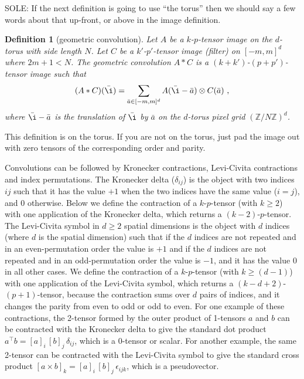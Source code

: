 \documentclass{article}
\theoremstyle{plain}
\newtheorem{definition}{Definition}
\begin{document}
SOLE: If the next definition is going to use ``the torus'' then we should say a few words about that up-front, or above in the image definition.

\begin{definition}[geometric convolution]
Let $A$ be a $k$-$p$-tensor image on the $d$-torus with side length $N$.
Let $C$ be a $k'$-$p'$-tensor image (filter) on $[-m, m]^d$ where $2m+1<N$.
The geometric convolution $A\ast C$ is a $(k+k')$-$(p+p')$-tensor image such that
\begin{equation}
    (A\ast C)(\bar\i) = \sum_{\bar a\in[-m, m]^d} A(\bar\i - \bar a)\otimes C(\bar a) ~,
\end{equation}
where $\bar\i - \bar a$ is the translation of $\bar\i$ by $\bar a$ on the $d$-torus pixel grid $(\mathbb Z / N\mathbb Z)^d$.
\end{definition}
This definition is on the torus. If you are not on the torus, just pad the image out with zero tensors of the corresponding order and parity. 

Convolutions can be followed by Kronecker contractions, Levi-Civita contractions and index permutations.
The Kronecker delta ($\delta_{ij}$) is the object with two indices $ij$ such that it has the value $+1$ when the two indices have the same value ($i=j$), and $0$ otherwise.
Below we define the contraction of a $k$-$p$-tensor (with $k\geq 2$) with one application of the Kronecker delta, which returns a $(k-2)$-$p$-tensor.
The Levi-Civita symbol in $d\geq 2$ spatial dimensions is the object with $d$ indices (where $d$ is the spatial dimension) such that if the $d$ indices are not repeated and in an even-permutation order the value is $+1$ and if the $d$ indices are not repeated and in an odd-permutation order the value is $-1$, and it has the value $0$ in all other cases.
We define the contraction of a $k$-$p$-tensor (with $k\geq (d-1)$) with one application of the Levi-Civita symbol, which returns a $(k-d+2)$-$(p+1)$-tensor, because the contraction sums over $d$ pairs of indices, and it changes the parity from even to odd or odd to even.
For one example of these contractions, the 2-tensor formed by the outer product of 1-tensors $a$ and $b$ can be contracted with the Kronecker delta to give the standard dot product $a^\top b = [a]_i\,[b]_j\,\delta_{ij}$, which is a 0-tensor or scalar.
For another example, the same 2-tensor can be contracted with the Levi-Civita symbol to give the standard cross product
$[a\times b]_k = [a]_i\,[b]_j\,\epsilon_{ijk}$, which is a pseudovector.
\end{document}
